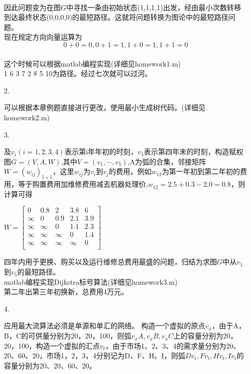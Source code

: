 \documentclass[a4paper,20pt]{article}
\begin{document}
\begin{itemize}
        \\因此问题变为在图$G$中寻找一条由初始状态(1,1,1,1)出发，经由最小次数转移到达最终状态(0,0,0,0)的最短路径。这就将问题转换为图论中的最短路径问题。
        \\现在规定方向向量运算为
        $$0+0=0,0+1=1,1+0=1,1+1=0$$
        \\这个时候可以根据matlab编程实现(详细见homework1.m)
        \\1     6     3     7     2     8     5    10为路径。经过七次就可以过河。

        \item[2.]
        \par 可以根据本章例题直接进行更改，使用最小生成树代码。(详细见homework2.m)
    \item[3.]
        \par 及$v_i(i=1,2,3,4)$表示第i年年初的时刻，$v_5$表示第四年末的时刻，构造赋权图$G=(V,A,W)$,其中$V=(v_1,\cdots,v_5)$,A为弧的合集，邻接矩阵$W=(w_{ij})_{5\times 5}$，这里$w_{ij}$为$v_i$到$v_j$的费用，例如$w_{12}$为第一年初到第二年初的费用，等于购置费用加维修费用减去机器处理价,$w_{12}=2.5+0.3-2.0=0.8$，则计算可得
        \begin{center}
            $W=\begin{bmatrix}
                    0      & 0.8    & 2      & 3.8    & 6   \\
                    \infty & 0      & 0.9    & 2.1    & 3.9 \\
                    \infty & \infty & 0      & 1.1    & 2.3 \\
                    \infty & \infty & \infty & 0      & 1.4 \\
                    \infty & \infty & \infty & \infty & 0   \\
                \end{bmatrix}$
        \end{center}
        \par  四年内用于更换、购买以及运行维修总费用最盛的问题，归结为求图$G$中从$v_1$到$v_5$的最短路径。
        \\matlab编程实现Dijkstra标号算法(详细见homework3.m)
        \\第二年出第三年初换新，总费用4万元。
    \item[4.]
    \par 应用最大流算法必须是单源和单汇的网络。
    构造一个虚拟的原点$v_x$，由于A，B，C的可供量分别为20，20，100，则弧$v_xA,v_xB,v_xC$上的容量分别为20，20，100，构造一个虚拟的汇点$v_t$，由于市场1、2、3、4的需求量分别为20、20、60、20，市场1，2，3，4分别记为D、F、H、I，则弧$Dv_t,Fv_t,Hv_t,Iv_t$的容量分别为20、20、60、20。

\end{itemize}
\end{document}
